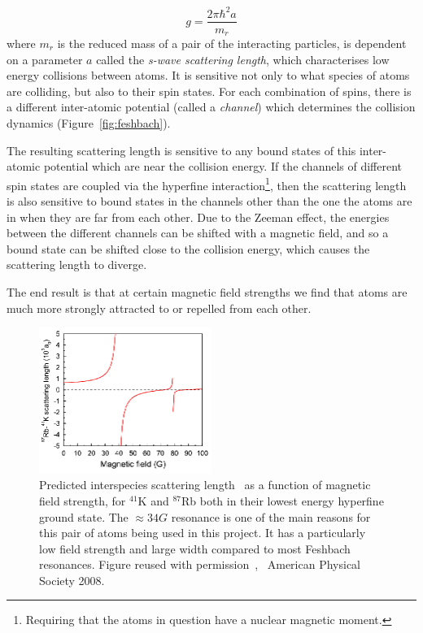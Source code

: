 \begin{equation}
g = \frac{2\pi \hbar^2 a}{m_r}
\end{equation}
where $m_r$ is the reduced mass of a pair of the interacting particles, is dependent on a parameter $a$ called the \emph{s-wave scattering length}, which characterises low energy collisions between atoms. It is sensitive not only to what species of atoms are colliding, but also to their spin states. For each combination of spins, there is a different inter-atomic potential (called a \emph{channel}) which determines the collision dynamics (Figure~\ref{fig:feshbach}).

The resulting scattering length is sensitive to any bound states of this inter-atomic potential which are near the collision energy. If the channels of different spin states are coupled via the hyperfine interaction\footnote{Requiring that the atoms in question have a nuclear magnetic moment.}, then the scattering length is also sensitive to bound states in the channels other than the one the atoms are in when they are far from each other. Due to the Zeeman effect, the energies between the different channels can be shifted with a magnetic field, and so a bound state can be shifted close to the collision energy, which causes the scattering length to diverge.

The end result is that at certain magnetic field strengths we find that atoms are much more strongly attracted to or repelled from each other.

\begin{figure}%
\begin{center}
\includegraphics[width=0.5\textwidth]{figures/unsorted/feshKRb.png}
\caption{Predicted interspecies scattering length~\cite{thalhammer_double_2008} as a function of magnetic field strength, for $^{41}$K and $^{87}$Rb both in their lowest energy hyperfine ground state. The $\approx34\unit{G}$ resonance is one of the main reasons for this pair of atoms being used in this project. It has a particularly low field strength and large width compared to most Feshbach resonances. Figure reused with permission~\cite{thalhammer_double_2008}, \textcopyright~American Physical Society 2008.}\label{fig:feshKRb}
\end{center}
\end{figure}

